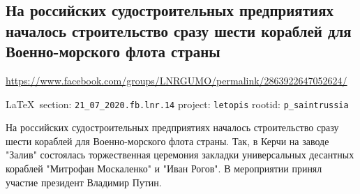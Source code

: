  
 
\subsection{На российских судостроительных предприятиях началось строительство сразу шести кораблей для Военно-морского флота страны}
\label{sec:21_07_2020.fb.lnr.14}
\url{https://www.facebook.com/groups/LNRGUMO/permalink/2863922647052624/}
  
\vspace{0.5cm}
{\small\LaTeX~section: \verb|21_07_2020.fb.lnr.14| project: \verb|letopis| rootid: \verb|p_saintrussia|}
\vspace{0.5cm}

На российских судостроительных предприятиях началось строительство сразу шести
кораблей для Военно-морского флота страны. Так, в Керчи на заводе "Залив"
состоялась торжественная церемония закладки универсальных десантных кораблей
"Митрофан Москаленко" и "Иван Рогов". В мероприятии принял участие президент
Владимир Путин.
  
